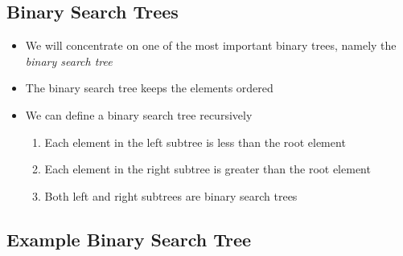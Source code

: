 \Outline %


\begin{slide}
\section{Binary Search Trees}

\begin{PauseHighLight}
  \begin{itemize}
  \item We will concentrate on one of the most important binary trees,
    namely the \emph{binary search tree}\pause
  \item The binary search tree keeps the elements ordered\pause
  \item We can define a binary search tree recursively\pause
    \begin{enumerate}
    \item Each element in the left subtree is less than the root element\pause
    \item Each element in the right subtree is greater than the root
      element\pause
    \item Both left and right subtrees are binary search trees\pause
    \end{enumerate}
  \end{itemize}
\end{PauseHighLight}
\end{slide}


\begin{slide}
\section[-1]{Example Binary Search Tree}

\begin{PauseHighLight}
  \begin{center}
    \pause
  \end{center}
\end{PauseHighLight}

\end{slide}


